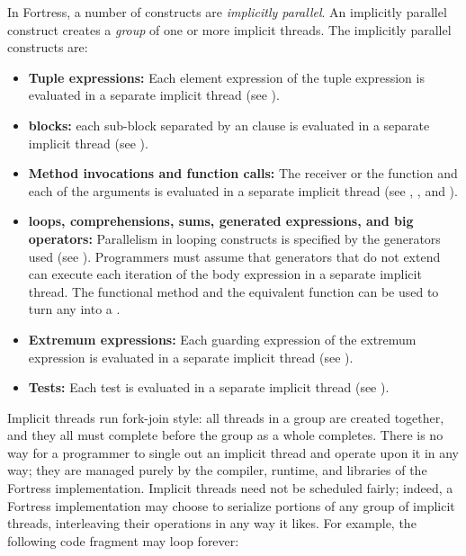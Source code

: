 In Fortress, a number of constructs are \emph{implicitly parallel}.
An implicitly parallel construct creates a \emph{group} of one or
more implicit threads.  The implicitly parallel constructs are:
\begin{itemize}
\item {\bf Tuple expressions:} Each element expression of the tuple
  expression is evaluated in a separate implicit thread
  (see ).
\item {\bf {} blocks:} each
  sub-block separated by an  clause is evaluated in a
  separate implicit thread (see ).
\item {\bf Method invocations and function calls:}
The receiver or the function and each of the arguments is
  evaluated in a separate implicit thread
  (see , ,
 and ).
\item {\bf {} loops, comprehensions, sums, generated
    expressions, and big operators:} Parallelism in looping constructs
  is specified by the generators used (see ).
  Programmers must assume that generators that do not extend
   can execute each iteration of the body
  expression in a separate implicit thread.  The functional method
   and the equivalent function  can be used
  to turn any  into a .
\item {\bf Extremum expressions:} Each guarding expression of the extremum
  expression is evaluated in a separate implicit thread
  (see ).
\item {\bf Tests:}
Each test is evaluated in a separate implicit thread
(see ).

\end{itemize}

Implicit threads run fork-join style:
all threads in a group are created together,
and they all must complete before the group as a whole completes.
There is no way for a programmer to single out an implicit
thread and operate upon it in any way; they are managed purely by the
compiler, runtime, and libraries of the Fortress implementation.
Implicit threads need not be scheduled fairly; indeed, a Fortress
implementation may choose to serialize portions of any group of
implicit threads, interleaving their operations in any way it likes.
For example, the following code fragment may loop forever:

